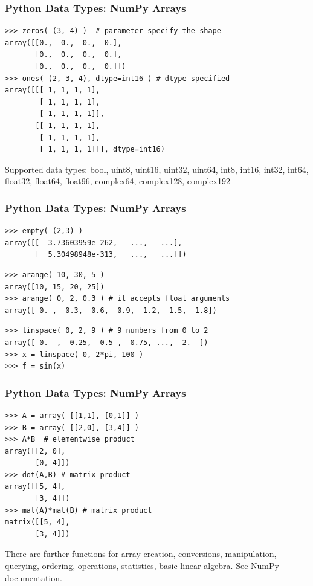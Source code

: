 \documentclass[t,10pt,compress=false,usepdftitle=false]{beamer}
\begin{document}
\begin{frame}[fragile]
    \frametitle{Python Data Types: NumPy Arrays}
    \begin{myColorBox}{0.9}{}
\begin{verbatim}
>>> zeros( (3, 4) )  # parameter specify the shape
array([[0.,  0.,  0.,  0.],
       [0.,  0.,  0.,  0.],
       [0.,  0.,  0.,  0.]])
>>> ones( (2, 3, 4), dtype=int16 ) # dtype specified
array([[[ 1, 1, 1, 1],
        [ 1, 1, 1, 1],
        [ 1, 1, 1, 1]],
       [[ 1, 1, 1, 1],
        [ 1, 1, 1, 1],
        [ 1, 1, 1, 1]]], dtype=int16)
\end{verbatim}
    \end{myColorBox}
Supported data types: bool, uint8, uint16, uint32, uint64, int8, int16, int32, int64, float32, float64, float96, complex64, complex128, complex192 
\end{frame}

\begin{frame}[fragile]
    \frametitle{Python Data Types: NumPy Arrays}
    \begin{myColorBox}{0.9}{}
\begin{verbatim}
>>> empty( (2,3) )
array([[  3.73603959e-262,   ...,   ...],
       [  5.30498948e-313,   ...,   ...]])
\end{verbatim}
    \end{myColorBox}
    \pause
    \begin{myColorBox}{0.9}{}
\begin{verbatim}
>>> arange( 10, 30, 5 )
array([10, 15, 20, 25])
>>> arange( 0, 2, 0.3 ) # it accepts float arguments
array([ 0. ,  0.3,  0.6,  0.9,  1.2,  1.5,  1.8])
\end{verbatim}
    \end{myColorBox}
    \pause
    \begin{myColorBox}{0.9}{}
\begin{verbatim}
>>> linspace( 0, 2, 9 ) # 9 numbers from 0 to 2
array([ 0.  ,  0.25,  0.5 ,  0.75, ...,  2.  ])
>>> x = linspace( 0, 2*pi, 100 )
>>> f = sin(x)
\end{verbatim}
    \end{myColorBox}
\end{frame}

\begin{frame}[fragile]
    \frametitle{Python Data Types: NumPy Arrays}
    \begin{myColorBox}{0.9}{}
\begin{verbatim}
>>> A = array( [[1,1], [0,1]] )
>>> B = array( [[2,0], [3,4]] )
>>> A*B  # elementwise product
array([[2, 0], 
       [0, 4]])
>>> dot(A,B) # matrix product
array([[5, 4],
       [3, 4]])
>>> mat(A)*mat(B) # matrix product
matrix([[5, 4],
       [3, 4]])
\end{verbatim}
    \end{myColorBox}
There are further functions for array creation, conversions, manipulation, querying, ordering, operations, statistics, basic linear algebra. See NumPy documentation.
\end{frame}
\end{document}
